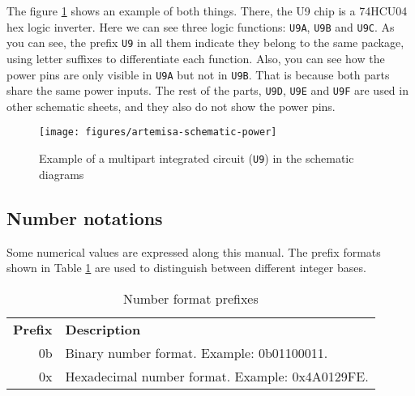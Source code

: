 The figure \ref{fig:schematic-multipart-ics} shows an example of both things. There, the U9 chip is a 74HCU04 hex logic inverter. Here we can see three logic functions: {\tt U9A}, {\tt U9B} and {\tt U9C}. As you can see, the prefix {\tt U9} in all them indicate they belong to the same package, using letter suffixes to differentiate each function. Also, you can see how the power pins are only visible in {\tt U9A} but not in {\tt U9B}. That is because both parts share the same power inputs. The rest of the parts, {\tt U9D}, {\tt U9E} and {\tt U9F} are used in other schematic sheets, and they also do not show the power pins.

\begin{figure}[h]
	\centering
	\texttt{[image: figures/artemisa-schematic-power]}
	\caption{Example of a multipart integrated circuit ({\tt U9}) in the schematic diagrams}
	\label{fig:schematic-multipart-ics}
\end{figure}


\subsection{Number notations}

Some numerical values are expressed along this manual. The prefix formats shown in Table \ref{table:number-formats} are used to distinguish between different integer bases. 

\begin{table}[h!]
	\centering
	\begin{tabular}{ r|l }
		{\bf Prefix} & {\bf Description}                               \\
		0b           & Binary number format. Example: 0b01100011.      \\
		0x           & Hexadecimal number format. Example: 0x4A0129FE. \\
	\end{tabular}
	\caption{Number format prefixes}
	\label{table:number-formats}
\end{table}
